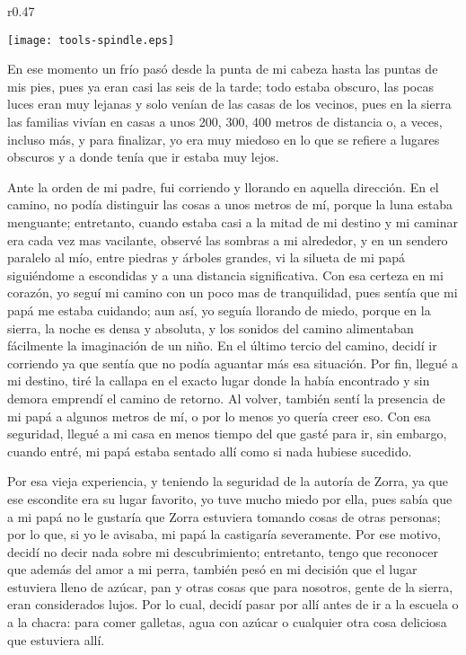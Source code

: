 \ifdefined\EnableIncludeImages
\begin{wrapfigure}{r}{0.47\textwidth}
  \begin{center}
  \vspace{-10pt}
    \texttt{[image: tools-spindle.eps]}
  \end{center}
  \vspace{-20pt}
\end{wrapfigure}
\fi
En ese momento un frío pasó desde la punta de mi cabeza hasta las puntas de mis pies, pues ya eran casi las seis de la tarde; todo estaba obscuro, las pocas luces eran muy lejanas y solo venían de las casas de los vecinos, pues en la sierra las familias vivían en casas a unos 200, 300, 400 metros de distancia o, a veces, incluso más, y para finalizar, yo era muy miedoso en lo que se refiere a lugares obscuros y a donde tenía que ir estaba muy lejos.

Ante la orden de mi padre, fui corriendo y llorando en aquella dirección. En el camino, no podía distinguir las cosas a unos metros de mí, porque la luna estaba menguante; entretanto, cuando estaba casi a la mitad de mi destino y mi caminar era cada vez mas vacilante, observé las sombras a mi alrededor, y en un sendero paralelo al mío, entre piedras y árboles grandes, vi la silueta de mi papá siguiéndome a escondidas y a una distancia significativa.
Con esa certeza en mi corazón, yo seguí mi camino con un poco mas de tranquilidad, pues sentía que mi papá me estaba cuidando; aun así, yo seguía llorando de miedo, porque en la sierra, la noche es densa y absoluta, y los sonidos del camino alimentaban fácilmente la imaginación de un niño.
En el último tercio del camino, decidí ir corriendo ya que sentía que no podía aguantar más esa situación. Por fin, llegué a mi destino, tiré la callapa en el exacto lugar donde la había encontrado y sin demora emprendí el camino de retorno.
Al volver, también sentí la presencia de mi papá a algunos metros de mí, o por lo menos yo quería creer eso. Con esa seguridad, llegué a mi casa en menos tiempo del que gasté para ir, sin embargo, cuando entré, mi papá estaba sentado allí como si nada hubiese sucedido.

Por esa vieja experiencia, y teniendo la seguridad de la autoría de Zorra, ya que ese escondite era su lugar favorito, yo tuve mucho miedo por ella, pues sabía que a mi papá no le gustaría que Zorra estuviera tomando cosas de otras personas; por lo que, si yo le avisaba, mi papá la castigaría severamente. Por ese motivo, decidí no decir nada sobre mi descubrimiento; entretanto, tengo que reconocer que además del amor a mi perra, también pesó en mi decisión que el lugar estuviera lleno de azúcar, pan y otras cosas que para nosotros, gente de la sierra, eran considerados lujos.
Por lo cual, decidí pasar por allí antes de ir a la escuela o a la chacra: para comer galletas, agua con azúcar o cualquier otra cosa deliciosa que estuviera allí.

